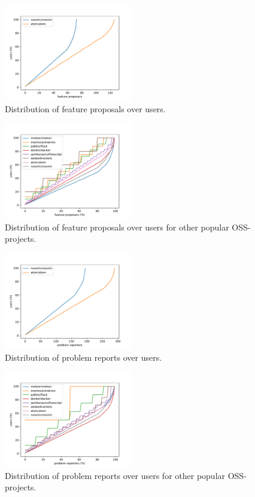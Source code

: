 \documentclass[a4paper,11pt]{article}
\begin{document}
{\begin{figure}[!h]
	\centering
	\includegraphics[width=0.5\textwidth]{feature_proposers_dist}
	\caption{Distribution of feature proposals over users.}
	\label{fig:feature_proposers}
\end{figure}
\begin{figure}[!h]
	\centering
	\includegraphics[width=0.5\textwidth]{all_feature_proposers_dist}
	\caption{Distribution of feature proposals over users for other popular OSS-projects.}
	\label{fig:all_feature_proposers}
\end{figure}
\begin{figure}[!h]
	\centering
	\includegraphics[width=0.5\textwidth]{problem_reporters_dist}
	\caption{Distribution of problem reports over users.}
	\label{fig:problem_reporters}
\end{figure}
\begin{figure}[!h]
	\centering
	\includegraphics[width=0.5\textwidth]{all_problem_reporters_dist}
	\caption{Distribution of problem reports over users for other popular OSS-projects.}
	\label{}
\end{figure}

}
\end{document}
